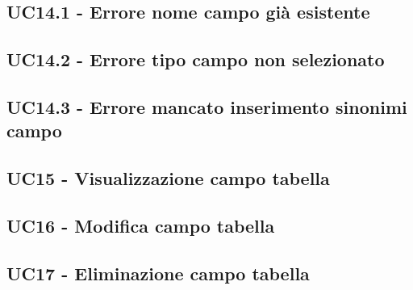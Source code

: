 \documentclass[5pt]{article}
\begin{document}
\subsection{UC14.1 - Errore nome campo già esistente}
\label{sec:UC14.1}

\subsection{UC14.2 - Errore tipo campo non selezionato}
\label{sec:UC14.2}

\subsection{UC14.3 - Errore mancato inserimento sinonimi campo}
\label{sec:UC14.3}

\subsection{UC15 - Visualizzazione campo tabella}
\label{sec:UC15}

\subsection{UC16 - Modifica campo tabella}
\label{sec:UC16}

\subsection{UC17 - Eliminazione campo tabella}
\label{sec:UC17}
\end{document}
